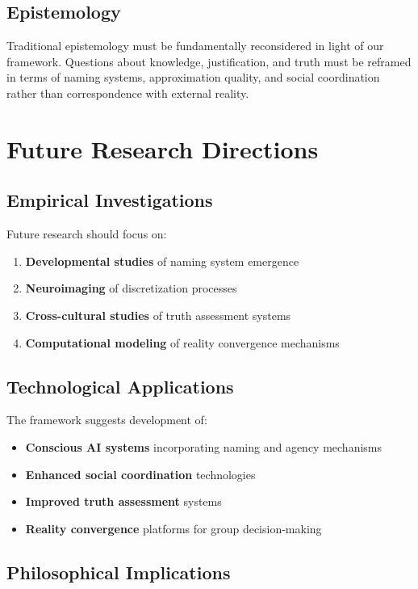 \documentclass[12pt]{article}
\begin{document}
\subsection{Epistemology}

Traditional epistemology must be fundamentally reconsidered in light of our framework. Questions about knowledge, justification, and truth must be reframed in terms of naming systems, approximation quality, and social coordination rather than correspondence with external reality.

\section{Future Research Directions}

\subsection{Empirical Investigations}

Future research should focus on:

\begin{enumerate}
\item \textbf{Developmental studies} of naming system emergence
\item \textbf{Neuroimaging} of discretization processes
\item \textbf{Cross-cultural studies} of truth assessment systems
\item \textbf{Computational modeling} of reality convergence mechanisms
\end{enumerate}

\subsection{Technological Applications}

The framework suggests development of:

\begin{itemize}
\item \textbf{Conscious AI systems} incorporating naming and agency mechanisms
\item \textbf{Enhanced social coordination} technologies
\item \textbf{Improved truth assessment} systems
\item \textbf{Reality convergence} platforms for group decision-making
\end{itemize}

\subsection{Philosophical Implications}
\end{document}
